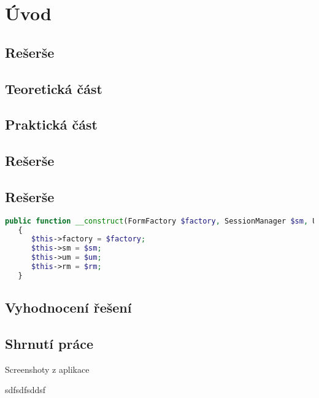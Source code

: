 \chapter{Úvod}

\section{Rešerše}

\section{Teoretická část}

\section{Praktická část}

\section{Rešerše}

\section{Rešerše}


\begin{lstlisting}[language=PHP, caption=PHP example]
public function __construct(FormFactory $factory, SessionManager $sm, UserManager $um, UserRoleManager $rm)
   {
      $this->factory = $factory;
      $this->sm = $sm;
      $this->um = $um;
      $this->rm = $rm;
   }
\end{lstlisting}


\section{Vyhodnocení řešení}



\section{Shrnutí práce}



Screenshoty z aplikace

sdfsdfsddsf \cite{szeliski_2011}